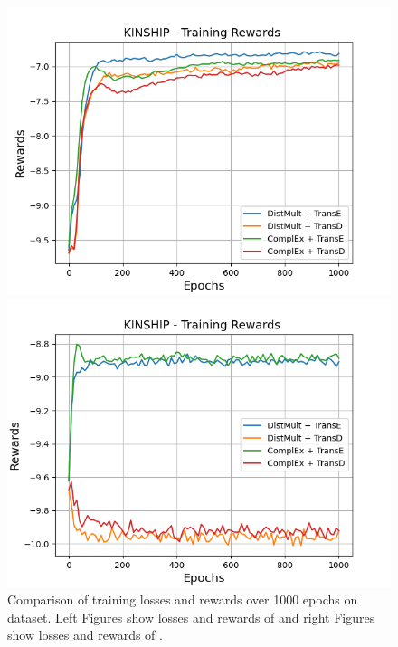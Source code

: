 \begin{figure}[H]
\begin{minipage}{.5\textwidth}
    \end{minipage}
    \begin{minipage}{.5\textwidth}
      \centering
      \includegraphics[width=0.9\linewidth]{figures/results/gan_train/not_pretrained/random/kinship/1k_epochs/random_kinship_rew.png}
    \end{minipage}%
    \begin{minipage}{.5\textwidth}
      \centering
      \includegraphics[width=0.9\linewidth]{figures/results/gan_train/not_pretrained/uncertainty/max_distribution/entropy/kinship/1k_epochs/uncertainty_kinship_rew.png}
    \end{minipage}%
    \caption{Comparison of training losses and rewards over 1000 epochs on \kinship dataset.
    Left Figures show losses and rewards of \origsampling and right Figures show losses and rewards of \ussoftmax.}
    \label{fig:advtrain_kinship_losses_rewards}
\end{figure}